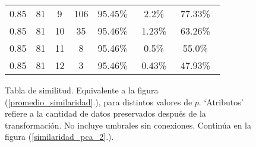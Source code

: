 \begin{figure}[!htbp]
{\begin{tabular}{ |c|c|c|c|c|c|c| }
        0.85             &81             &9            &106                 & 95.45\%\     & 2.2\%\               & 77.33\%\ \\
        0.85             &81             &10            &35                 & 95.46\%\     & 1.23\%\               & 63.26\%\ \\
        0.85             &81             &11            &8                 & 95.46\%\     & 0.5\%\               & 55.0\%\ \\
        0.85             &81             &12            &3                 & 95.46\%\     & 0.43\%\               & 47.93\%\ \\
        \hline
        \end{tabular}
    }
    \bigskip
    \caption{Tabla de similitud. Equivalente a la figura (\ref{promedio_similaridad}.), para distintos valores de $p$. `Atributos' refiere a la cantidad de datos preservados después de la transformación. No incluye umbrales sin conexiones. Continúa en la figura (\ref{similaridad_pca_2}.).} \label{similaridad_pca}
\end{figure}


